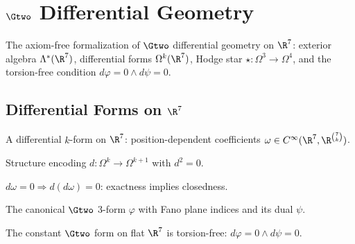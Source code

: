 
\chapter{$\Gtwo$ Differential Geometry}\label{chap:geometry}

The axiom-free formalization of $\Gtwo$ differential geometry on $\R^7$:
exterior algebra $\Lambda^*(\R^7)$, differential forms $\Omega^k(\R^7)$,
Hodge star $\star : \Omega^3 \to \Omega^4$, and the torsion-free condition
$d\varphi = 0 \wedge d\psi = 0$.

\section{Differential Forms on $\R^7$}

\begin{definition}\label{def:diffform}
    \leanok
    A differential $k$-form on $\R^7$: position-dependent coefficients
    $\omega \in C^\infty(\R^7, \R^{\binom{7}{k}})$.
\end{definition}

\begin{definition}\label{def:ext_deriv}
    \leanok
    Structure encoding $d : \Omega^k \to \Omega^{k+1}$ with $d^2 = 0$.
\end{definition}

\begin{theorem}\label{thm:exact_closed}
    \leanok
    $d\omega = 0 \Rightarrow d(d\omega) = 0$: exactness implies closedness.
\end{theorem}

\begin{definition}\label{def:standardG2}
    \leanok
    The canonical $\Gtwo$ 3-form $\varphi$ with Fano plane indices and its dual $\psi$.
\end{definition}

\begin{theorem}\label{thm:standardG2_tf}
    \leanok
    The constant $\Gtwo$ form on flat $\R^7$ is torsion-free: $d\varphi = 0 \wedge d\psi = 0$.
\end{theorem}

